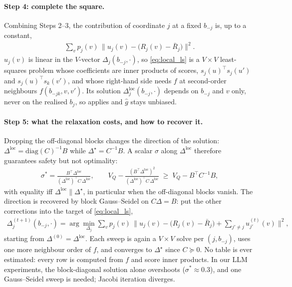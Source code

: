\documentclass[10pt]{article}
\theoremstyle{plain}
\theoremstyle{definition}
\theoremstyle{remark}
\theoremstyle{definition}
\newcommand{\score}[1]{s_{#1}}               %
\newcommand{\Dstar}{\Delta^{\star}}
\newcommand{\VQ}{V_{Q}}
\newcommand{\pj}[1]{p_{#1}}                  %
\begin{document}
\paragraph{Step 4: complete the square.} Combining Steps 2--3, the contribution of coordinate $j$ at a fixed $b_{-j}$ is, up to a constant,
\begin{align}
    \sum_v \pj{j}(v)\,\big\|u_j(v)-\big(R_j(v)-\bar R_j\big)\big\|^2 .
    \label{eq:local_ls}
\end{align}
$u_j(v)$ is linear in the $V$-vector $\Delta_j(b_{-j},\cdot)$, so \eqref{eq:local_ls} is a $V\times V$ least-squares problem whose coefficients are inner products of scores, $\score{j}(u)^\top \score{j}(u')$ and $\score{j}(u)^\top \score{k}(v')$, and whose right-hand side needs $f$ at second-order neighbours $f(b_{-jk},v,v')$. Its solution $\Delta^{\mathrm{loc}}_j(b_{-j},\cdot)$ depends on $b_{-j}$ and $v$ only, never on the realised $b_j$, so  applies and $\hat g$ stays unbiased.

\paragraph{Step 5: what the relaxation costs, and how to recover it.} Dropping the off-diagonal blocks changes the direction of the solution: $\Delta^{\mathrm{loc}}=\mathrm{diag}(C)^{-1}B$ while $\Dstar=C^{-1}B$. A scalar $\sigma$ along $\Delta^{\mathrm{loc}}$ therefore guarantees safety but not optimality:
\begin{align}
    \sigma^*=\frac{B^\top\Delta^{\mathrm{loc}}}{(\Delta^{\mathrm{loc}})^\top C\,\Delta^{\mathrm{loc}}},\qquad
    \VQ-\frac{(B^\top\Delta^{\mathrm{loc}})^2}{(\Delta^{\mathrm{loc}})^\top C\,\Delta^{\mathrm{loc}}}\;\ge\;\VQ-B^\top C^{-1}B,
\end{align}
with equality iff $\Delta^{\mathrm{loc}}\parallel\Dstar$, in particular when the off-diagonal blocks vanish. The direction is recovered by block Gauss--Seidel on $C\Delta=B$: put the other corrections into the target of \eqref{eq:local_ls},
\begin{align}
    \Delta_j^{(t+1)}(b_{-j},\cdot)=\arg\min_{\Delta_j}\sum_v \pj{j}(v)\,\Big\|u_j(v)-\big(R_j(v)-\bar R_j\big)+\sum_{j'\neq j}u^{(t)}_{j'}(v)\Big\|^2,
    \label{eq:gs}
\end{align}
starting from $\Delta^{(0)}=\Delta^{\mathrm{loc}}$. Each sweep is again a $V\times V$ solve per $(j,b_{-j})$, uses one more neighbour order of $f$, and converges to $\Dstar$ since $C\succeq0$. No table is ever estimated: every row is computed from $f$ and score inner products. In our LLM experiments, the block-diagonal solution alone overshoots ($\sigma^*\approx0.3$), and one Gauss--Seidel sweep is needed; Jacobi iteration diverges.
\end{document}
